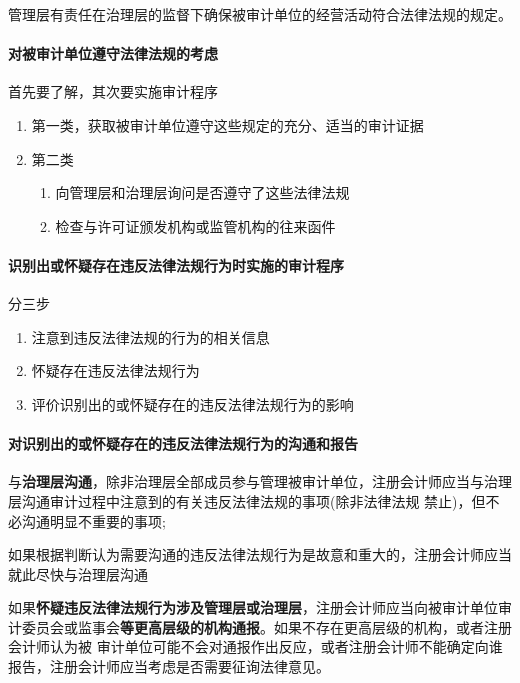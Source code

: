 \documentclass[UTF8,12pt]{ctexart}
\numberwithin{equation}{section} %
\numberwithin{figure}{section}
\numberwithin{table}{section}
\begin{document}
	管理层有责任在治理层的监督下确保被审计单位的经营活动符合法律法规的规定。
	
	\paragraph{对被审计单位遵守法律法规的考虑}
	首先要了解，其次要实施审计程序
	\begin{enumerate}
		\item 第一类，获取被审计单位遵守这些规定的充分、适当的审计证据
		
		\item 第二类
		\begin{enumerate}
			\item 向管理层和治理层询问是否遵守了这些法律法规
			
			\item 检查与许可证颁发机构或监管机构的往来函件
		\end{enumerate}
	\end{enumerate}
	
	\paragraph{识别出或怀疑存在违反法律法规行为时实施的审计程序}
	分三步
	\begin{enumerate}
		\item 注意到违反法律法规的行为的相关信息
		
		\item 怀疑存在违反法律法规行为
		
		\item 评价识别出的或怀疑存在的违反法律法规行为的影响
	\end{enumerate}
	
	\paragraph{对识别出的或怀疑存在的违反法律法规行为的沟通和报告}
	
	与\textbf{治理层沟通}，除非治理层全部成员参与管理被审计单位，注册会计师应当与治理层沟通审计过程中注意到的有关违反法律法规的事项(除非法律法规 禁止)，但不必沟通明显不重要的事项; 
	
	如果根据判断认为需要沟通的违反法律法规行为是故意和重大的，注册会计师应当就此尽快与治理层沟通
	
	如果\textbf{怀疑违反法律法规行为涉及管理层或治理层}，注册会计师应当向被审计单位审计委员会或监事会\textbf{等更高层级的机构通报}。如果不存在更高层级的机构，或者注册会计师认为被 审计单位可能不会对通报作出反应，或者注册会计师不能确定向谁报告，注册会计师应当考虑是否需要征询法律意见。
	
\end{document}
